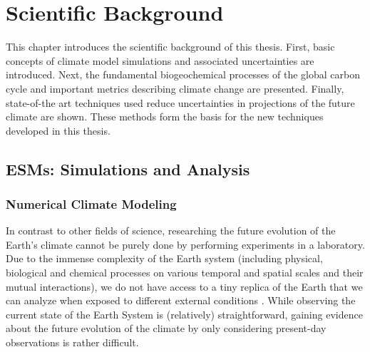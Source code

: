 


\chapter{Scientific Background}
\label{ch:02:scientific_background}

This chapter introduces the scientific background of this thesis. First, basic
concepts of climate model simulations and associated uncertainties are
introduced. Next, the fundamental biogeochemical processes of the global carbon
cycle and important metrics describing climate change are presented. Finally,
state-of-the art techniques used reduce uncertainties in projections of the
future climate are shown. These methods form the basis for the new techniques
developed in this thesis.


\section{\aclp{ESM}: Simulations and Analysis}
\label{sec:02:esms}


\subsection{Numerical Climate Modeling}
\label{subsec:02:climate_modeling}

In contrast to other fields of science, researching the future evolution of the
Earth's climate cannot be purely done by performing experiments in a
laboratory. Due to the immense complexity of the Earth system (including
physical, biological and chemical processes on various temporal and spatial
scales and their mutual interactions), we do not have access to a tiny replica
of the Earth that we can analyze when exposed to different external conditions
\autocite{Flato2011}. While observing the current state of the Earth System is
(relatively) straightforward, gaining evidence about the future evolution of
the climate by only considering present-day observations is rather difficult.

